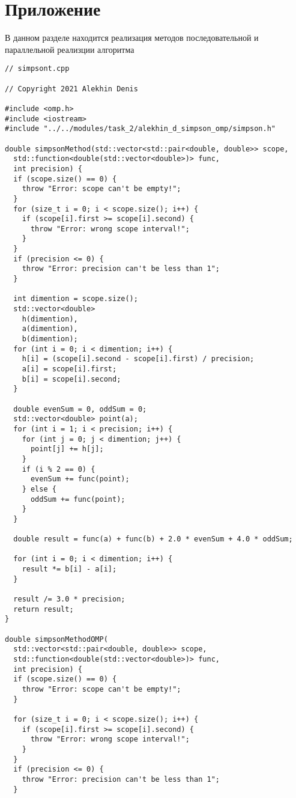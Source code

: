 \documentclass{report}
\begin{document}
\section*{Приложение}
В данном разделе находится реализация методов последовательной и параллельной реализции алгоритма
\begin{lstlisting}
// simpsont.cpp

// Copyright 2021 Alekhin Denis

#include <omp.h>
#include <iostream>
#include "../../modules/task_2/alekhin_d_simpson_omp/simpson.h"

double simpsonMethod(std::vector<std::pair<double, double>> scope,
  std::function<double(std::vector<double>)> func,
  int precision) {
  if (scope.size() == 0) {
    throw "Error: scope can't be empty!";
  }
  for (size_t i = 0; i < scope.size(); i++) {
    if (scope[i].first >= scope[i].second) {
      throw "Error: wrong scope interval!";
    }
  }
  if (precision <= 0) {
    throw "Error: precision can't be less than 1";
  }

  int dimention = scope.size();
  std::vector<double>
    h(dimention),
    a(dimention),
    b(dimention);
  for (int i = 0; i < dimention; i++) {
    h[i] = (scope[i].second - scope[i].first) / precision;
    a[i] = scope[i].first;
    b[i] = scope[i].second;
  }

  double evenSum = 0, oddSum = 0;
  std::vector<double> point(a);
  for (int i = 1; i < precision; i++) {
    for (int j = 0; j < dimention; j++) {
      point[j] += h[j];
    }
    if (i % 2 == 0) {
      evenSum += func(point);
    } else {
      oddSum += func(point);
    }
  }

  double result = func(a) + func(b) + 2.0 * evenSum + 4.0 * oddSum;

  for (int i = 0; i < dimention; i++) {
    result *= b[i] - a[i];
  }

  result /= 3.0 * precision;
  return result;
}

double simpsonMethodOMP(
  std::vector<std::pair<double, double>> scope,
  std::function<double(std::vector<double>)> func,
  int precision) {
  if (scope.size() == 0) {
    throw "Error: scope can't be empty!";
  }

  for (size_t i = 0; i < scope.size(); i++) {
    if (scope[i].first >= scope[i].second) {
      throw "Error: wrong scope interval!";
    }
  }
  if (precision <= 0) {
    throw "Error: precision can't be less than 1";
  }


\end{lstlisting}
\end{document}
